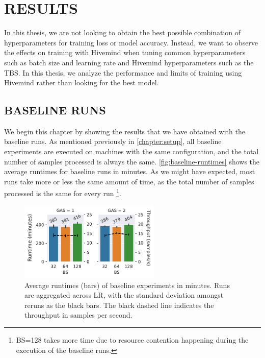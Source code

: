 \chapter{RESULTS}\label{chapter:results}

In this thesis, we are not looking to obtain the best possible combination of hyperparameters for training loss or model accuracy.
Instead, we want to observe the effects on training with Hivemind when tuning common hyperparameters such as batch size and learning rate and Hivemind hyperparameters such as the TBS.
In this thesis, we analyze the performance and limits of training using Hivemind rather than looking for the best model.

\section{BASELINE RUNS}

We begin this chapter by showing the results that we have obtained with the baseline runs.
As mentioned previously in \autoref{chapter:setup}, all baseline experiments are executed on machines with the same configuration, and the total number of samples processed is always the same.
\autoref{fig:baseline-runtimes} shows the average runtimes for baseline runs in minutes.
As we might have expected, most runs take more or less the same amount of time, as the total number of samples processed is the same for every run
\footnote{
    BS=128 takes more time due to resource contention happening during the execution of the baseline runs.
}.

\begin{figure}[ht]
    \centering
    \includegraphics[width=0.6\textwidth]{./figures/06_barplot-runtime_baseline-16vCPUs-GAS-1.pdf}
    \caption{
        Average runtimes (bars) of baseline experiments in minutes.
        Runs are aggregated across LR, with the standard deviation amongst reruns as the black bars.
        The black dashed line indicates the throughput in samples per second.
    }
    \label{fig:baseline-runtimes}
\end{figure}

